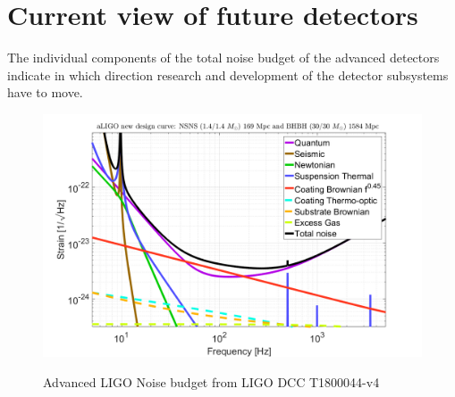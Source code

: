 \section{Current view of future detectors}
                 
The individual components of the total noise budget of the advanced detectors indicate in which direction research and development of the detector subsystems have to move.

\begin{figure}[h]
\includegraphics[width=\textwidth]{Figures/aLIGO_newDesign.png}
\label{fig:ALIGOSensitivity}
\caption[Advanced LIGO Noise budget]{Advanced LIGO Noise budget from LIGO DCC T1800044-v4 }
\end{figure}



